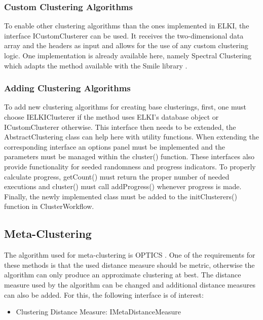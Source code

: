 \documentclass[
	a4paper,
	english,
	twoside,
	openright,               
	11pt                            
	]{report}
\begin{document}
\subsubsection{Custom Clustering Algorithms}
To enable other clustering algorithms than the ones implemented in ELKI, the interface ICustomClusterer can be used. It receives the two-dimensional data array and the headers as input and allows for the use of any custom clustering logic. One implementation is already available here, namely Spectral Clustering which adapts the method available with the Smile library \cite{javasmile}.
 
\subsubsection*{Adding Clustering Algorithms}
To add new clustering algorithms for creating base clusterings, first, one must choose IELKIClusterer if the method uses ELKI's database object or ICustomClusterer otherwise. This interface then needs to be extended, the AbstractClustering class can help here with utility functions. When extending the corresponding interface an options panel must be implemented and the parameters must be managed within the cluster() function. These interfaces also provide functionality for seeded randomness and progress indicators. To properly calculate progress, getCount() must return the proper number of needed executions and cluster() must call addProgress() whenever progress is made. Finally, the newly implemented class must be added to the initClusterers() function in ClusterWorkflow.


\subsection{Meta-Clustering}
The algorithm used for meta-clustering is OPTICS \cite{10.1145/304181.304187}. One of the requirements for these methods is that the used distance measure should be metric, otherwise the algorithm can only produce an approximate clustering at best. The distance measure used by the algorithm can be changed and additional distance measures can also be added. For this, the following interface is of interest:

\begin{itemize}
  \item Clustering Distance Measure: IMetaDistanceMeasure
\end{itemize}
\end{document}
